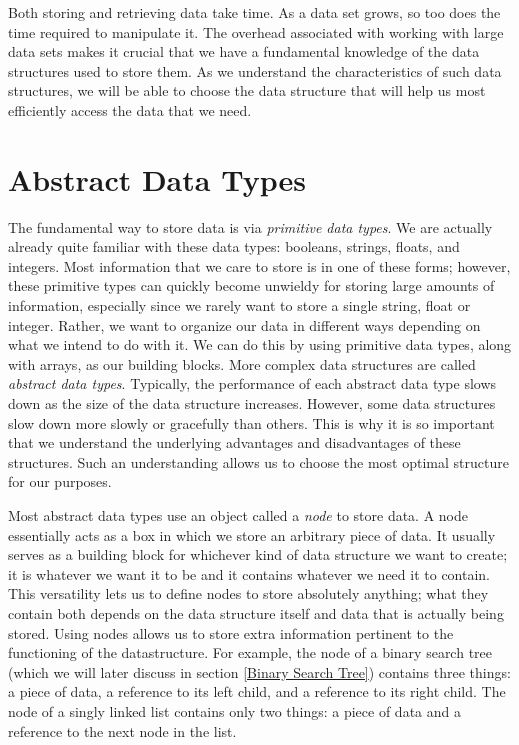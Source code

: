 \label{lab:Python_DataStructures}

Both storing and retrieving data take time. As a data set grows, so too does the time required to manipulate it. 
The overhead associated with working with large data sets makes it crucial that we have a fundamental knowledge of the data structures used to store them.
As we understand the characteristics of such data structures, we will be able to choose the data structure that will help us most efficiently access the data that we need.

\section*{Abstract Data Types}
The fundamental way to store data is via \emph{primitive data types}.
We are actually already quite familiar with these data types: booleans, strings, floats, and integers.
Most information that we care to store is in one of these forms; however, these primitive types can quickly become unwieldy for storing large amounts of information, especially since we rarely want to store a single string, float or integer. Rather, we want to organize our data in different ways depending on what we intend to do with it.
We can do this by using primitive data types, along with arrays, as our building blocks.
More complex data structures are called \emph{abstract data types}.
Typically, the performance of each abstract data type slows down as the size of the data structure increases.
However, some data structures slow down more slowly or gracefully than others.
This is why it is so important that we understand the underlying advantages and disadvantages of these structures.
Such an understanding allows us to choose the most optimal structure for our purposes.

Most abstract data types use an object called a \emph{node} to store data.
A node essentially acts as a box in which we store an arbitrary piece of data.
It usually serves as a building block for whichever kind of data structure we want to create; it is whatever we want it to be and it contains whatever we need it to contain.
This versatility lets us to define nodes to store absolutely anything; what they contain both depends on the data structure itself and data that is actually being stored.
Using nodes allows us to store extra information pertinent to the functioning of the datastructure.
For example, the node of a binary search tree (which we will later discuss in section \ref{Binary Search Tree}) contains three things: a piece of data, a reference to its left child, and a reference to its right child.
The node of a singly linked list contains only two things: a piece of data and a reference to the next node in the list.

